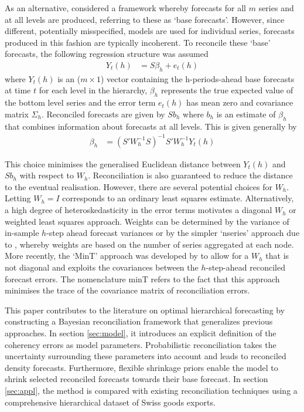 \documentclass[a4paper,fleqn,11pt]{article}
\begin{document}
As an alternative, \cite{Hyndman2011} considered a framework whereby forecasts for all $m$ series and at all levels are produced, referring to these as `base forecasts'.  However, since different, potentially misspecified, models are used for individual series, forecasts produced in this fashion are typically incoherent. To reconcile these `base' forecasts, \cite{Hyndman2011} the following regression structure was assumed
\begin{align}
Y_t(h) &= S\beta_{h} + e_t(h)
\end{align}
where $Y_t(h)$ is an ($m \times 1$) vector containing the h-periods-ahead base forecasts at time $t$ for each level in the hierarchy, $\beta_{h}$ represents the true expected value of the bottom level series and the error term $e_t(h)$ has mean zero and covariance matrix $\Sigma_h$. Reconciled forecasts are given by $Sb_{h}$ where $b_h$ is an estimate of $\beta_{h}$ that combines information about forecasts at all levels.  This is given generally by
\begin{align}
\label{eq:reg}
\beta_{h} &= \left(S'W_h^{-1}S \right)^{-1} S'W_h^{-1}Y_t(h)
\end{align}

This choice minimises the generalised Euclidean distance between $Y_t(h)$ and $Sb_{h}$ with respect to $W_h$. Reconciliation is also guaranteed to reduce the distance to the eventual realisation.  However, there are several potential choices for $W_h$.  Letting $W_h=I$ corresponds to an ordinary least squares estimate.  Alternatively, a high degree of heteroskedasticity in the error terms motivates a diagonal $W_h$ or weighted least squares approach. Weights can be determined by the variance of in-sample $h$-step ahead forecast variances or by the simpler `nseries' approach due to \cite{Athanasopoulos2017}, whereby weights are based on the number of series aggregated at each node.  More recently, the `MinT' approach was developed by \cite{Wickramasuriya2015} to allow for a $W_h$ that is not diagonal and exploits the covariances between the $h$-step-ahead reconciled forecast errors. The nomenclature minT refers to the fact that this approach minimises the trace of the covariance matrix of reconciliation errors.  

This paper contributes to the literature on optimal hierarchical forecasting by constructing a Bayesian reconciliation framework that generalizes previous approaches. In section \ref{sec:model}, it introduces an explicit definition of the coherency errors as model parameters. Probabilistic reconciliation takes the uncertainty surrounding these parameters into account and leads to reconciled density forecasts. Furthermore, flexible shrinkage priors enable the model to shrink selected reconciled forecasts towards their base forecast. In section \ref{sec:appl}, the method is compared with existing reconciliation techniques using a comprehensive hierarchical dataset of Swiss goods exports.
\end{document}
